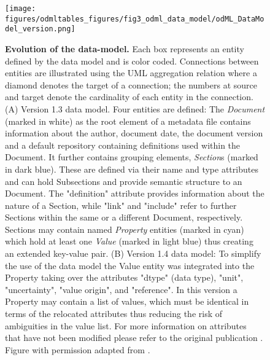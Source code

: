 \begin{figure}
    \centering
    \texttt{[image: figures/odmltables\_figures/fig3\_odml\_data\_model/odML\_DataModel\_version.png]}
    \caption[Evolution of the  data-model]{\textbf{Evolution of the  data-model.} Each box represents an entity defined by the data model and is color coded. Connections between entities are illustrated using the UML aggregation relation where a diamond denotes the target of a connection; the numbers at source and target denote the cardinality of each entity in the connection. (A) Version 1.3 data model. Four entities are defined: The \textit{Document} (marked in white) as the root element of a metadata file contains information about the author, document date, the document version and a default repository containing definitions used within the Document. It further contains grouping elements, \textit{Section}s (marked in dark blue). These are defined via their name and type attributes and can hold Subsections and provide semantic structure to an  Document. The "definition" attribute provides information about the nature of a Section, while "link" and "include" refer to further Sections within the same or a different Document, respectively. Sections may contain named \textit{Property} entities (marked in cyan) which hold at least one \textit{Value} (marked in light blue) thus creating an extended key-value pair. (B) Version 1.4 data model: To simplify the use of the  data model the Value entity was integrated into the Property taking over the attributes "dtype" (data type), "unit", "uncertainty", "value origin", and "reference". In this version a Property may contain a list of values, which must be identical in terms of the relocated attributes thus reducing the risk of ambiguities in the value list. For more information on attributes that have not been modified please refer to the original publication \citep{Grewe_2011}. Figure with permission adapted from \cite{Grewe_2011}.}
    \label{fig:odml_versions}
\end{figure}

